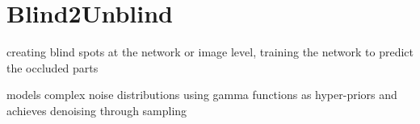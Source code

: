 \chapter{Blind2Unblind}

creating blind spots at the network or image level, training the network to predict the occluded parts



models complex noise distributions using gamma functions as hyper-priors and achieves denoising through sampling
